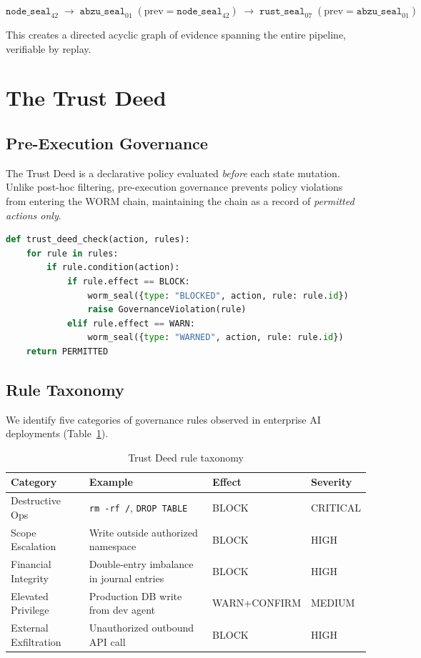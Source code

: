 \documentclass[12pt,letterpaper]{article}
\begin{document}
\[
  \texttt{node\_seal}_{42} \;\to\; \texttt{abzu\_seal}_{01}
    \;(\text{prev} = \texttt{node\_seal}_{42})
  \;\to\; \texttt{rust\_seal}_{07}
    \;(\text{prev} = \texttt{abzu\_seal}_{01})
\]

This creates a directed acyclic graph of evidence spanning the entire pipeline,
verifiable by replay.

\section{The Trust Deed}
\label{sec:trustdeed}

\subsection{Pre-Execution Governance}

The Trust Deed is a declarative policy evaluated \emph{before} each state
mutation. Unlike post-hoc filtering, pre-execution governance prevents policy
violations from entering the WORM chain, maintaining the chain as a record of
\emph{permitted actions only}.

\begin{lstlisting}[language=Python, caption={Trust Deed evaluation}]
def trust_deed_check(action, rules):
    for rule in rules:
        if rule.condition(action):
            if rule.effect == BLOCK:
                worm_seal({type: "BLOCKED", action, rule: rule.id})
                raise GovernanceViolation(rule)
            elif rule.effect == WARN:
                worm_seal({type: "WARNED", action, rule: rule.id})
    return PERMITTED
\end{lstlisting}

\subsection{Rule Taxonomy}

We identify five categories of governance rules observed in enterprise AI
deployments (Table~\ref{tab:rules}).

\begin{table}[h]
\centering
\caption{Trust Deed rule taxonomy}
\label{tab:rules}
\begin{tabular}{@{}llll@{}}
\toprule
\textbf{Category} & \textbf{Example} & \textbf{Effect} & \textbf{Severity} \\
\midrule
Destructive Ops      & \texttt{rm -rf /}, \texttt{DROP TABLE}      & BLOCK          & CRITICAL \\
Scope Escalation     & Write outside authorized namespace          & BLOCK          & HIGH     \\
Financial Integrity  & Double-entry imbalance in journal entries   & BLOCK          & HIGH     \\
Elevated Privilege   & Production DB write from dev agent          & WARN+CONFIRM   & MEDIUM   \\
External Exfiltration& Unauthorized outbound API call              & BLOCK          & HIGH     \\
\bottomrule
\end{tabular}
\end{table}
\end{document}
